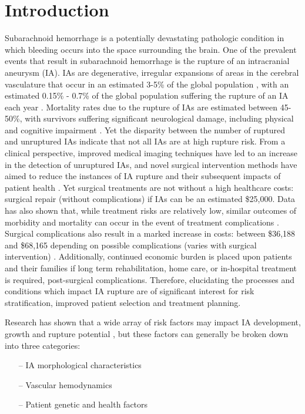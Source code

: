 \cleartooddpage[\thispagestyle{empty}]
\chapter{Introduction}\label{CHAPTER1}

Subarachnoid hemorrhage is a potentially devastating pathologic condition in which bleeding occurs into the space surrounding the brain. One of the prevalent events that result in subarachnoid hemorrhage is the rupture of an intracranial aneurysm (IA). IAs are degenerative, irregular expansions of areas in the cerebral vasculature that occur in an estimated 3-5\% of the global population \cite{revilla2018prevalence,hackenberg2018unruptured,villablanca2013natural}, with an estimated 0.15\% - 0.7\% of the global population suffering the rupture of an IA each year \cite{hughes2018estimating}. Mortality rates due to the rupture of IAs are estimated between 45-50\%, with survivors suffering significant neurological damage, including physical and cognitive impairment \cite{LONGO2017632,villablanca2013natural}. Yet the disparity between the number of ruptured and unruptured IAs indicate that not all IAs are at high rupture risk. 
	From a clinical perspective, improved medical imaging techniques have led to an increase in the detection of unruptured IAs, and novel surgical intervention methods have aimed to reduce the instances of IA rupture and their subsequent impacts of patient health \cite{molyneux2002international,komotar2008guidelines}. Yet surgical treatments are not without a high healthcare costs: surgical repair (without complications) if IAs can be an estimated \$25,000. Data has also shown that, while treatment risks are relatively low, similar outcomes of morbidity and mortality can occur in the event of treatment complications \cite{mascitelli2015predictors,liu2016recanalization,chalouhi2015safety}. Surgical complications also result in a marked increase in costs: between \$36,188 and \$68,165 depending on possible complications (varies with surgical intervention) \cite{brinjikji2012hospitalization}. Additionally, continued economic burden is placed upon patients and their families if long term rehabilitation, home care, or in-hospital treatment is required, post-surgical complications. Therefore, elucidating the processes and conditions which impact IA rupture are of significant interest for risk stratification, improved patient selection and treatment planning.
	
Research has shown that a wide array of risk factors may impact IA development, growth and rupture potential \cite{Korja2014,penn2014role,starke2014tumor,diagbouga2018role}, but these factors can generally be broken down into three categories:
	\begin{itemize}
  		\item[--] IA morphological characteristics
 	    \item[--] Vascular hemodynamics
 	    \item[--] Patient genetic and health factors
	\end{itemize}

